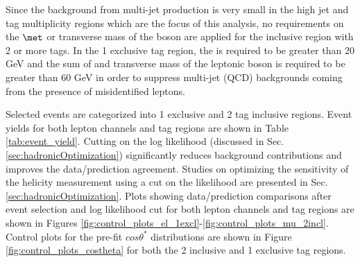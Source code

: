 Since the background from multi-jet production is very small in the high
jet and \bt tag multiplicity regions which are the focus of this analysis, no requirements on the $\met$
or transverse mass of the \w boson are applied for the inclusive region with 2 or more \bt tags. In the 1 exclusive \bt tag region, the \met is required to be greater than 20 GeV and the sum of \met and transverse mass of the leptonic \w boson is required to be greater than 60 GeV in order to suppress multi-jet (QCD) backgrounds coming from the presence of misidentified leptons.


Selected events are categorized into 1 exclusive and 2 \bt tag inclusive regions. Event yields for both lepton channels and \bt tag regions are shown in Table \ref{tab:event_yield}. Cutting on the log likelihood (discussed in Sec. \ref{sec:hadronicOptimization}) significantly reduces background contributions and improves the data/prediction agreement. Studies on optimizing the sensitivity of the \w helicity measurement using a cut on the likelihood are presented in Sec. \ref{sec:hadronicOptimization}. %
Plots showing data/prediction comparisons after event selection and log likelihood cut for both lepton channels and \bt tag regions are shown in Figures \ref{fig:control_plots_el_1excl}-\ref{fig:control_plots_mu_2incl}. Control plots for the pre-fit $cos\theta^*$ distributions are shown in Figure \ref{fig:control_plots_costheta} for both the 2 inclusive and 1 exclusive \bt tag regions.

